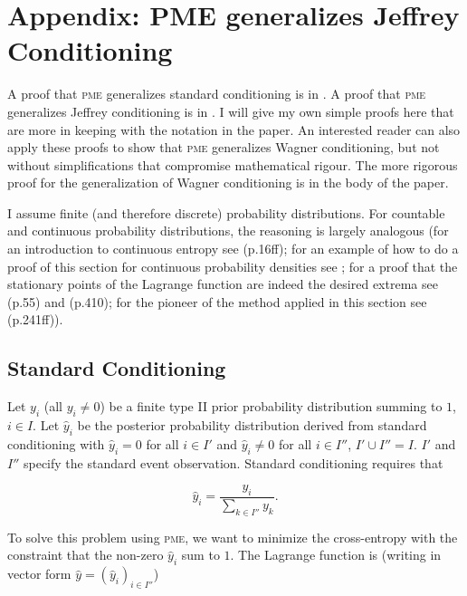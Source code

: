 \documentclass[entropy,article,accept,oneauthor,pdftex,12pt,a4paper]{mdpi}
\begin{document}
\appendix

\section{Appendix: PME generalizes Jeffrey Conditioning}
\label{appendix}

A proof that \textsc{pme} generalizes standard conditioning is in
\cite{ref-34}. A proof that \textsc{pme} generalizes Jeffrey conditioning is in
\cite{ref-1}. I will give my own simple proofs here that are more in keeping
with the notation in the paper. An interested reader can also apply
these proofs to show that \textsc{pme} generalizes Wagner
conditioning, but not without simplifications that compromise
mathematical rigour. The more rigorous proof for the generalization of
Wagner conditioning is in the body of the paper.

I assume finite (and therefore discrete) probability distributions.
For countable and continuous probability distributions, the reasoning
is largely analogous (for an introduction to continuous entropy see
\cite{ref-7} (p.16ff); for an example of how to do a proof of this section for
continuous probability densities see \cite{ref-1,ref-11}; for a proof that the
stationary points of the Lagrange function are indeed the desired
extrema see \cite{ref-36} (p.55) and \cite{ref-2} (p.410); for the pioneer of the method
applied in this section see \cite{ref-11} (p.241ff)).

\subsection{Standard Conditioning}
\label{sc}

Let $y_{i}$ (all $y_{i}\neq{}0$) be a finite type II prior probability
distribution summing to $1$, $i\in{}I$. Let $\hat{y}_{i}$ be the
posterior probability distribution derived from standard conditioning
with $\hat{y}_{i}=0$ for all $i\in{}I'$ and $\hat{y}_{i}\neq{}0$ for
all $i\in{}I''$, $I'\cup{}I''=I$. $I'$ and $I''$ specify the standard
event observation. Standard conditioning requires that

\begin{equation}
  \label{eq:sc}
  \hat{y}_{i}=\frac{y_{i}}{\sum_{k\in{}I''}y_{k}}.
\end{equation}

{\noindent}To solve this problem using \textsc{pme}, we want to minimize the
cross-entropy with the constraint that the non-zero $\hat{y}_{i}$ sum to
$1$. The Lagrange function is (writing in vector form
$\hat{y}=(\hat{y}_{i})_{i\in{}I''}$)
\end{document}
